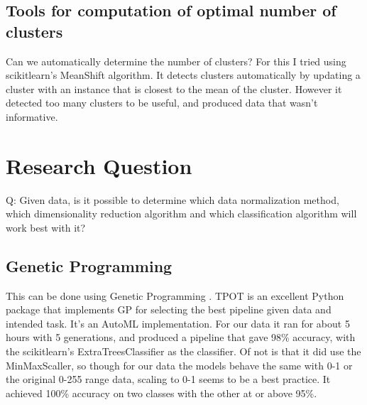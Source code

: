\documentclass[12pt]{report}
\begin{document}
\subsection{Tools for computation of optimal number of clusters}
Can we automatically determine the number of clusters?
For this I tried using scikit\-learn's MeanShift algorithm. It detects clusters automatically by updating a cluster with an instance that is closest to the mean of the cluster.
However it detected too many clusters to be useful, and produced data that wasn't informative.
\section{Research Question}
Q: Given data, is it possible to determine which data normalization method, which dimensionality reduction algorithm and which classification algorithm will work best with it?
\subsection{Genetic Programming}
This can be done using Genetic Programming \parencite{geneticprogramming}. TPOT \parencite{tpot} is an excellent Python package that implements GP for selecting the best pipeline given data and intended task. It's an AutoML \parencite{automl} implementation.
For our data it ran for about 5 hours with 5 generations, and produced a pipeline that gave 98\% accuracy, with the scikit\-learn's ExtraTreesClassifier as the classifier. Of not is that it did use the MinMaxScaller, so though for our data the models behave the same with 0-1 or the original 0-255 range data, scaling to 0-1 seems to be a best practice.
It achieved 100\% accuracy on two classes with the other at or above 95\%.


\printbibliography
\end{document}
